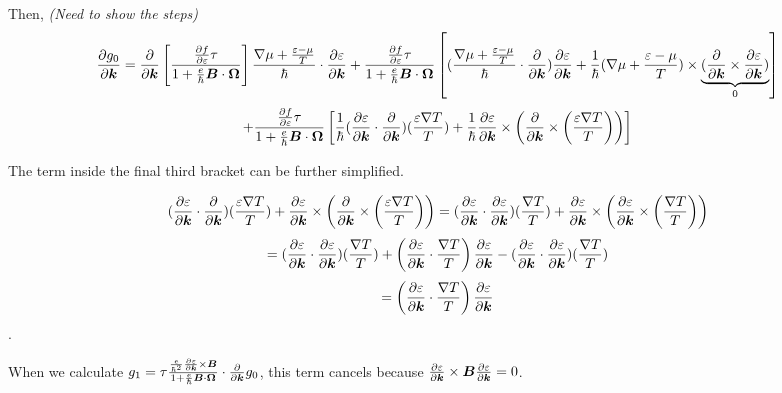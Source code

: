 \documentclass{report}
\renewcommand\vec[1]{\ensuremath\boldsymbol{#1}} %
\begin{document}
Then, \textit{(Need to show the steps)}
$$\frac{\partial g_0}{\partial \vec{k}} = 
\frac{\partial}{\partial \vec{k}} \left[ \frac{\frac{\partial f} {\partial \varepsilon} \tau}{1 + \frac{e}{\hbar} \vec{B}\cdot\vec{\Omega}}
\right] \frac{\nabla \mu + \frac{\varepsilon - \mu}{T}}{\hbar} \cdot \frac{\partial \varepsilon}{\partial \vec{k}} + \frac{\frac{\partial f} {\partial \varepsilon} \tau}{1 + \frac{e}{\hbar} \vec{B}\cdot\vec{\Omega}} \left[(\frac{\nabla \mu + \frac{\varepsilon - \mu}{T}}{\hbar} \cdot \frac{\partial }{\partial \vec{k}} )\frac{\partial \varepsilon}{\partial \vec{k}} + \frac{1}{\hbar} (\nabla \mu + \frac{\varepsilon - \mu}{T})\times \underbrace{(\frac{\partial }{\partial \vec{k}} \times \frac{\partial \varepsilon}{\partial \vec{k}})}_0 \right]
$$
$$+ \frac{\frac{\partial f} {\partial \varepsilon} \tau}{1 + \frac{e}{\hbar} \vec{B}\cdot\vec{\Omega}} \left[\frac{1}{\hbar} (\frac{\partial \varepsilon}{\partial \vec{k}} \cdot \frac{\partial }{\partial \vec{k}}) (\frac{\varepsilon \nabla T}{T}) + \frac{1}{\hbar} \frac{\partial \varepsilon}{\partial \vec{k}} \times \left(  \frac{\partial }{\partial \vec{k}} \times \left(\frac{\varepsilon \nabla T}{T}\right) \right) \right]$$

The term inside the final third bracket can be further simplified.

$$ (\frac{\partial \varepsilon}{\partial \vec{k}} \cdot \frac{\partial }{\partial \vec{k}}) (\frac{\varepsilon \nabla T}{T}) + \frac{\partial \varepsilon}{\partial \vec{k}} \times \left(  \frac{\partial }{\partial \vec{k}} \times \left(\frac{\varepsilon \nabla T}{T}\right) \right) = (\frac{\partial \varepsilon}{\partial \vec{k}} \cdot \frac{\partial \varepsilon}{\partial \vec{k}}) (\frac{ \nabla T}{T}) + \frac{\partial \varepsilon}{\partial \vec{k}} \times \left(  \frac{\partial \varepsilon}{\partial \vec{k}} \times \left(\frac{\nabla T}{T}\right) \right)$$
$$  =(\frac{\partial \varepsilon}{\partial \vec{k}} \cdot \frac{\partial \varepsilon}{\partial \vec{k}}) (\frac{ \nabla T}{T}) + \left(  \frac{\partial \varepsilon}{\partial \vec{k}} \cdot \frac{\nabla T}{T}\right) \frac{\partial \varepsilon}{\partial \vec{k}} -  (\frac{\partial \varepsilon}{\partial \vec{k}} \cdot \frac{\partial \varepsilon}{\partial \vec{k}}) (\frac{ \nabla T}{T})$$
$$= \left(  \frac{\partial \varepsilon}{\partial \vec{k}} \cdot \frac{\nabla T}{T}\right) \frac{\partial \varepsilon}{\partial \vec{k}}$$.

When we calculate $g_1 = \tau \frac{\frac{e}{\hbar^2} \frac{\partial \varepsilon}{\partial \vec{k}} \times \vec{B}}{1 + \frac{e}{\hbar} \vec{B}\cdot\vec{\Omega}} \cdot\frac{\partial}{\partial \vec{k}} g_0$, this term cancels because $\frac{\partial \varepsilon}{\partial \vec{k}} \times \vec{B}  \frac{\partial \varepsilon}{\partial \vec{k}} = 0$.
\end{document}
